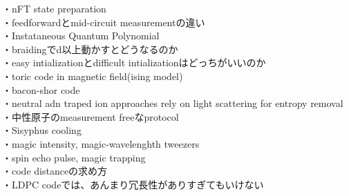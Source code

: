 \documentclass[a4paper,10.5pt]{ltjsarticle}
\begin{document}
・nFT state preparation\\
・feedforwardとmid-circuit measurementの違い\\
・Instataneous Quantum Polynomial\\
・braidingでd以上動かすとどうなるのか\\
・easy intializationとdifficult intializationはどっちがいいのか\\
・toric code in magnetic field(ising model)\\
・bacon-shor code\\
・neutral adn traped ion approaches rely on light scattering for entropy removal\\
・中性原子のmeasurement freeなprotocol\\
・Sisyphus cooling\\
・magic intensity, magic-wavelenghth tweezers\\
・spin echo pulse, magic trapping\\
・code distanceの求め方\\
・LDPC codeでは、あんまり冗長性がありすぎてもいけない\\
\end{document}
